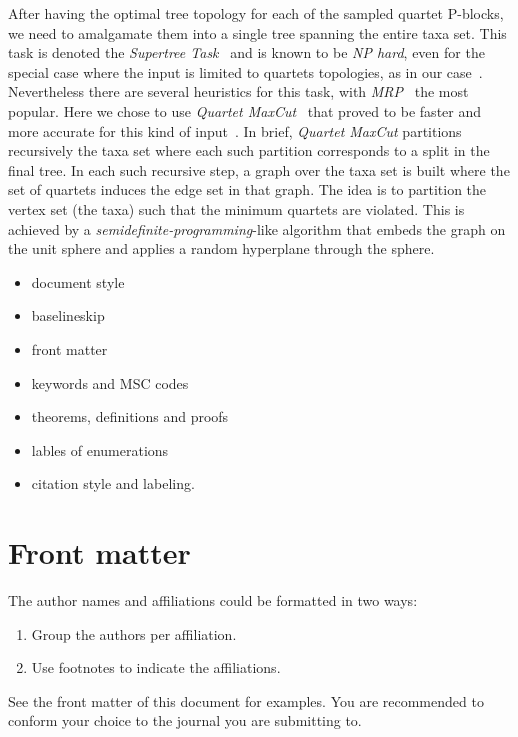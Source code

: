 \documentclass[review]{elsarticle}
\begin{document}
{After having the optimal tree topology for each of the sampled quartet P-blocks, we need to amalgamate  them into a single tree spanning the entire taxa set. This task is denoted the {\em Supertree Task}~\cite{bininda-book-2004}
and is known to be {\em NP hard}, even for the special case where the input 
is limited to 
quartets topologies, as in our case~\cite{NPsteel}. Nevertheless there are several heuristics
for this task, with {\em MRP}~\cite{Baum1992,Ragan1992} the most popular. Here we chose to use {\em Quartet MaxCut}~\cite{sni:rao:10,sni:rao:12}
that proved to be faster and more accurate for this kind of input~\cite{Avni-JME-2018}. In brief, {\em Quartet MaxCut} partitions recursively the taxa set where
each such partition corresponds to a split in the final tree. In each
such recursive step, a graph over the taxa set is built where the set
of quartets induces the edge set in that graph. The idea is to
partition the vertex set (the taxa) such that the minimum quartets are
violated. This is achieved by a {\em semidefinite-programming}-like
algorithm that embeds the graph on the unit sphere and applies a
random hyperplane through the sphere.



\begin{itemize}
\item document style
\item baselineskip
\item front matter
\item keywords and MSC codes
\item theorems, definitions and proofs
\item lables of enumerations
\item citation style and labeling.
\end{itemize}

\section{Front matter}

The author names and affiliations could be formatted in two ways:
\begin{enumerate}[(1)]
\item Group the authors per affiliation.
\item Use footnotes to indicate the affiliations.
\end{enumerate}
See the front matter of this document for examples. You are recommended to conform your choice to the journal you are submitting to.

}
\end{document}
